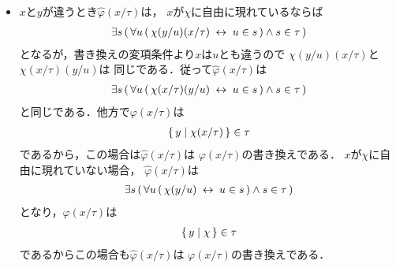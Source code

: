 \begin{metaprf}
\begin{description}
\begin{description}
\begin{itemize}
							\item $x$と$y$が違うとき$\widehat{\varphi}(x/\tau)$は，
								$x$が$\chi$に自由に現れているならば
								\begin{align}
									\exists s\, (\, \forall u\, (\, \chi(y/u)(x/\tau) \hspace{0.25em}\leftrightarrow\hspace{0.25em} u \in s\, ) \wedge s \in \tau\, )
								\end{align}
								となるが，書き換えの変項条件より$x$は$u$とも違うので
								$\chi(y/u)(x/\tau)$と$\chi(x/\tau)(y/u)$は
								同じである．従って$\widehat{\varphi}(x/\tau)$は
								\begin{align}
									\exists s\, (\, \forall u\, (\, \chi(x/\tau)(y/u) \hspace{0.25em}\leftrightarrow\hspace{0.25em} u \in s\, ) \wedge s \in \tau\, )
								\end{align}
								と同じである．他方で$\varphi(x/\tau)$は
								\begin{align}
									\{\, y \mid \chi(x/\tau)\, \} \in \tau
								\end{align}
								であるから，この場合は$\widehat{\varphi}(x/\tau)$は
								$\varphi(x/\tau)$の書き換えである．
								$x$が$\chi$に自由に現れていない場合，
								$\widehat{\varphi}(x/\tau)$は
								\begin{align}
									\exists s\, (\, \forall u\, (\, \chi(y/u) \hspace{0.25em}\leftrightarrow\hspace{0.25em} u \in s\, ) \wedge s \in \tau\, )
								\end{align}
								となり，$\varphi(x/\tau)$は
								\begin{align}
									\{\, y \mid \chi\, \} \in \tau
								\end{align}
								であるからこの場合も$\widehat{\varphi}(x/\tau)$は
								$\varphi(x/\tau)$の書き換えである．
						\end{itemize}
					

\end{description}
\end{description}
\end{metaprf}
